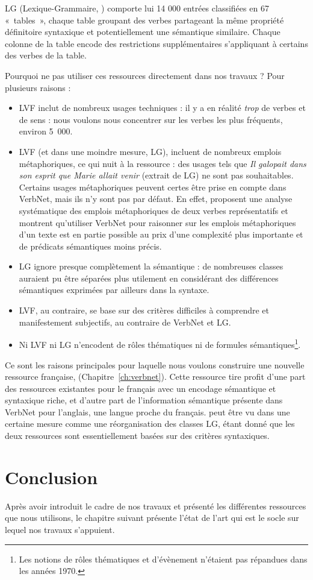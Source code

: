 LG (Lexique-Grammaire, \cite{gross1975methodes,boons1976structure}) comporte
lui 14 000 entrées classifiées en 67 «~tables~», chaque table groupant des
verbes partageant la même propriété définitoire syntaxique et potentiellement
une sémantique similaire. Chaque colonne de la table encode des restrictions
supplémentaires s'appliquant à certains des verbes de la table.


Pourquoi ne pas utiliser ces ressources directement dans nos travaux ? Pour
plusieurs raisons :

\begin{itemize}
    \item LVF inclut de nombreux usages techniques : il y a en réalité
        \textit{trop} de verbes et de sens : nous voulons nous concentrer sur les
        verbes les plus fréquents, environ 5~000.
    \item LVF (et dans une moindre mesure, LG), incluent de nombreux emplois
        métaphoriques, ce qui nuit à la ressource : des usages tels que
        \textit{Il galopait dans son esprit que Marie allait venir} (extrait de
        LG) ne sont pas souhaitables. Certains usages métaphoriques peuvent
        certes être prise en compte dans VerbNet, mais ils n'y sont pas par
        défaut. En effet, \cite{brown2012semantic} proposent une analyse
        systématique des emplois métaphoriques de deux verbes représentatifs et
        montrent qu'utiliser VerbNet pour raisonner sur les emplois
        métaphoriques d'un texte est en partie possible au prix d'une complexité
        plus importante et de prédicats sémantiques moins précis.
    \item LG ignore presque complètement la sémantique : de nombreuses classes
        auraient pu être séparées plus utilement en considérant des différences
        sémantiques exprimées par ailleurs dans la syntaxe.
    \item LVF, au contraire, se base sur des critères difficiles à comprendre et
        manifestement subjectifs, au contraire de VerbNet et LG.
    \item Ni LVF ni LG n'encodent de rôles thématiques ni de formules
        sémantiques\footnote{Les notions de rôles thématiques et d'évènement
        n'étaient pas répandues dans les années 1970.}.
\end{itemize}

Ce sont les raisons principales pour laquelle nous voulons construire une
nouvelle ressource française, \verbenet{} (Chapitre~\ref{ch:verbnet}). Cette
ressource tire profit d'une part des ressources existantes pour le français
avec un encodage sémantique et syntaxique riche, et d'autre part de
l'information sémantique présente dans VerbNet pour l'anglais, une langue
proche du français. \verbenet{} peut être vu dans une certaine mesure comme une
réorganisation des classes LG, étant donné que les deux ressources sont
essentiellement basées sur des critères syntaxiques.

\section*{Conclusion}

Après avoir introduit le cadre de nos travaux et présenté les différentes
ressources que nous utilisons, le chapitre suivant présente l'état de l'art qui
est le socle sur lequel nos travaux s'appuient.
